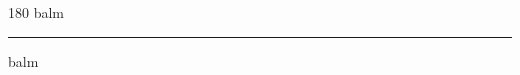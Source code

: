 
\begin{frame}
\begin{center}
\begin{turn}{180}
{\fontsize{2.5cm}{1em}\selectfont balm}
\end{turn}
\vspace{1em}\par  
\hrule
\vspace{1em}\par  
{\fontsize{2.5cm}{1em}\selectfont balm}
\end{center}
\end{frame}

